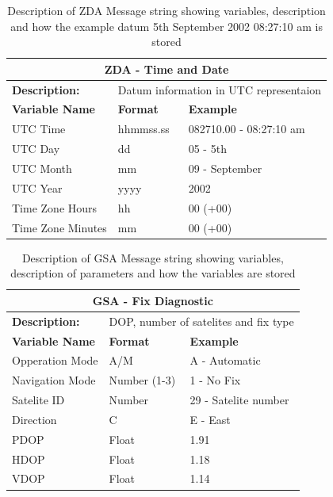 \begin{table}[H]
	\centering
	\caption{Description of ZDA Message string showing variables, description and how the example datum 5th September 2002 08:27:10 am is stored}
	\begin{tabular}{|l|l|l|}
		\hline
		\multicolumn{3}{|c|}{\textbf{ZDA - Time and Date}}\\
		\hline
		\textbf{Description:} & \multicolumn{2}{l|}{Datum information in UTC representaion}\\
		\hline
		\textbf{Variable Name} & \textbf{Format}& \textbf{Example} \\
		\hline
		UTC Time & hhmmss.ss & 082710.00 - 08:27:10 am\\
		\hline
		UTC Day  & dd & 05 - 5th \\
		\hline
		UTC Month & mm & 09 - September\\
		\hline
		UTC Year & yyyy & 2002 \\
		\hline
		Time Zone Hours & hh & 00 (+00)\\
		\hline
		Time Zone Minutes & mm & 00 (+00)\\
		\hline
	\end{tabular}
	\label{tab:NMEA_ZDA}
\end{table}

\begin{table}[H]
	\centering
	\caption{Description of GSA Message string showing variables, description of parameters and how the variables are stored}
	\begin{tabular}{|l|l|l|}
		\hline
		\multicolumn{3}{|c|}{\textbf{GSA - Fix Diagnostic}}\\
		\hline
		\textbf{Description:} & \multicolumn{2}{l|}{ DOP, number of satelites and fix type}\\
		\hline
		\textbf{Variable Name} & \textbf{Format}& \textbf{Example} \\
		\hline
		Opperation Mode & A/M & A - Automatic\\
		\hline
		Navigation Mode  & Number (1-3) & 1 - No Fix \\
		\hline
		Satelite ID & Number  & 29 - Satelite number \\
		\hline
		Direction & C & E - East \\
		\hline
		PDOP & Float & 1.91 \\
		\hline
		HDOP & Float & 1.18 \\
		\hline
		VDOP & Float & 1.14 \\
		\hline
	\end{tabular}
	
	\label{tab:NMEA_GSA}
\end{table}

